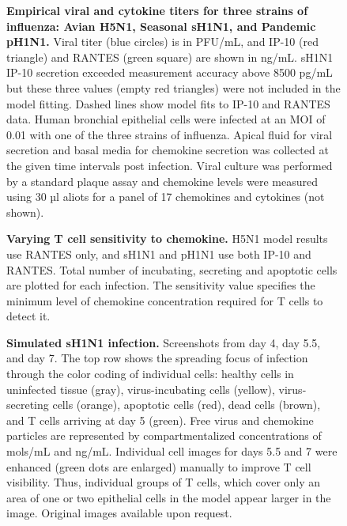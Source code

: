 \documentclass[10pt]{article}
\begin{document}
\begin{figure}[!ht]
\begin{center}
 \end{center}
\caption{{\bf Empirical viral and cytokine titers for three strains of influenza: Avian H5N1, Seasonal sH1N1, and Pandemic pH1N1.}  Viral titer (blue circles) is in PFU/mL, and IP-10 (red triangle) and RANTES (green square) are shown in ng/mL.   sH1N1 IP-10 secretion exceeded measurement accuracy above 8500 pg/mL but these three values (empty red triangles) were not included in the model fitting.  Dashed lines show model fits to IP-10 and RANTES data.  Human bronchial epithelial cells were infected at an MOI of 0.01 with one of the three strains of influenza.  Apical fluid for viral secretion and basal media for chemokine secretion was collected at the given time intervals post infection.  Viral culture was performed by a standard plaque assay and chemokine levels were measured using 30 µl aliots for a panel of 17 chemokines and cytokines (not shown).} 
 \label{fig:data}
\end{figure}


\begin{figure}[!ht]
\begin{center}
 \end{center}
\caption{{\bf Varying T cell sensitivity to chemokine.}  H5N1 model results use RANTES  only, and sH1N1 and pH1N1 use both IP-10 and RANTES. Total number of incubating, secreting and apoptotic cells are plotted for each infection.  The sensitivity value specifies the minimum level of chemokine concentration required for T cells to detect it. } 
 \label{fig:sensitivity}
\end{figure}


\begin{figure}[!ht]
\begin{center}
 \end{center}
\caption{{\bf Simulated sH1N1 infection.} Screenshots from day 4, day 5.5, and day 7.  The top row shows the spreading focus of infection  through the color coding of individual cells:  healthy cells in uninfected tissue (gray),  virus-incubating cells (yellow), virus-secreting cells (orange), apoptotic cells (red), dead cells (brown), and T cells arriving at day 5 (green).  Free virus and chemokine particles are represented by compartmentalized concentrations of mols/mL and ng/mL.  Individual cell images for days 5.5 and 7 were enhanced (green dots are enlarged) manually to improve T cell visibility.  Thus, individual groups of T cells, which cover only an area of one or two epithelial cells in the model appear larger in the image.  Original images available upon request. } 
 \label{fig:cycells}
\end{figure}
\end{document}
